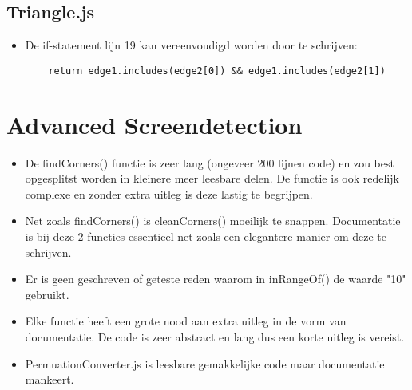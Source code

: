 \documentclass[a4paper,11pt]{article}
\begin{document}
\subsection{Triangle.js}
\begin{itemize}
	\item De if-statement lijn 19 kan vereenvoudigd worden door te schrijven:
	\begin{verbatim}
	return edge1.includes(edge2[0]) && edge1.includes(edge2[1])
	\end{verbatim}
\end{itemize}





\section{Advanced Screendetection}

\begin{itemize}
\item De findCorners() functie is zeer lang (ongeveer 200 lijnen code) en zou best opgesplitst worden in kleinere meer leesbare delen. De functie is ook redelijk complexe en zonder extra uitleg is deze lastig te begrijpen.
\item Net zoals findCorners() is cleanCorners() moeilijk te snappen. Documentatie is bij deze 2 functies essentieel net zoals een elegantere manier om deze te schrijven.
\item Er is geen geschreven of geteste reden waarom in inRangeOf() de waarde "10" gebruikt.
\item Elke functie heeft een grote nood aan extra uitleg in de vorm van documentatie. De code is zeer abstract en lang dus een korte uitleg is vereist.
\item PermuationConverter.js is leesbare gemakkelijke code maar documentatie mankeert.
\end{itemize}
\end{document}
